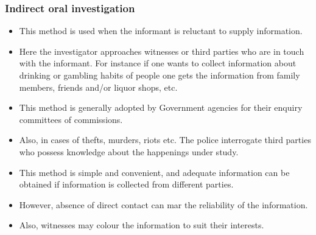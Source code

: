 \documentclass[
10pt, %
a4paper, %
]{report}
\begin{document}
\subsubsection*{Indirect oral investigation}
\begin{itemize}
\item This method is used when the informant is reluctant to supply
information.
\item Here the investigator approaches witnesses or third parties who are in touch with the informant. For instance if one wants to collect information about drinking or gambling habits of people
one gets the information from family members, friends and/or liquor shops, etc.
\item This method is generally adopted by Government agencies for
their enquiry committees of commissions.
\item Also, in cases of thefts, murders, riots etc. The police interrogate third parties who possess knowledge about the happenings under study.
\item This method is simple and convenient, and adequate information can be obtained if information is collected from different parties.
\item However, absence of direct contact can mar the reliability of the information.
\item Also, witnesses may colour the information to suit their interests.
\end{itemize}
\end{document}
